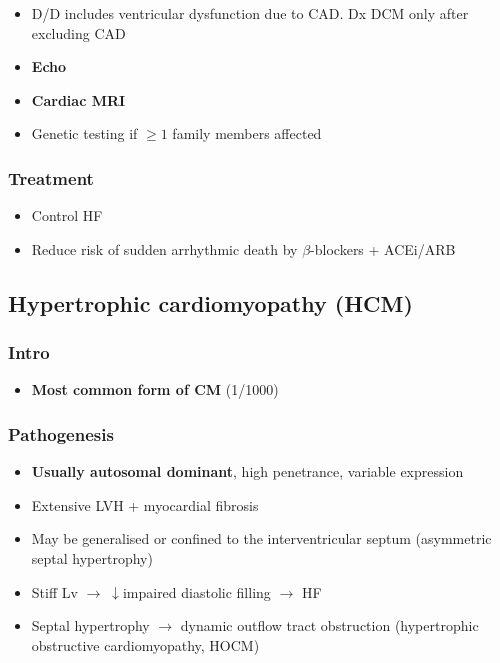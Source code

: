\documentclass[
  12pt,
]{memoir}
\providecommand{\tightlist}{%
  \setlength{\itemsep}{0pt}\setlength{\parskip}{0pt}}
\begin{document}
\begin{itemize}
\tightlist
\item
  D/D includes ventricular dysfunction due to CAD. Dx DCM only after
  excluding CAD
\item
  \textbf{Echo}
\item
  \textbf{Cardiac MRI}
\item
  Genetic testing if \(\ge 1\) family members affected
\end{itemize}

\hypertarget{treatment-7}{%
\subsubsection{Treatment}\label{treatment-7}}

\begin{itemize}
\tightlist
\item
  Control HF
\item
  Reduce risk of sudden arrhythmic death by \(\beta\)-blockers +
  ACEi/ARB
\end{itemize}

\hypertarget{hypertrophic-cardiomyopathy-hcm}{%
\subsection{Hypertrophic cardiomyopathy
(HCM)}\label{hypertrophic-cardiomyopathy-hcm}}

\hypertarget{intro-10}{%
\subsubsection{Intro}\label{intro-10}}

\begin{itemize}
\tightlist
\item
  \textbf{Most common form of CM} (1/1000)
\end{itemize}

\hypertarget{pathogenesis-11}{%
\subsubsection{Pathogenesis}\label{pathogenesis-11}}

\begin{itemize}
\tightlist
\item
  \textbf{Usually autosomal dominant}, high penetrance, variable
  expression
\item
  Extensive LVH + myocardial fibrosis
\item
  May be generalised or confined to the interventricular septum
  (asymmetric septal hypertrophy)
\item
  Stiff Lv \(\rightarrow\;\downarrow\)impaired diastolic filling
  \(\rightarrow\) HF
\item
  Septal hypertrophy \(\rightarrow\) dynamic outflow tract obstruction
  (hypertrophic obstructive cardiomyopathy, HOCM)
\end{itemize}
\end{document}
